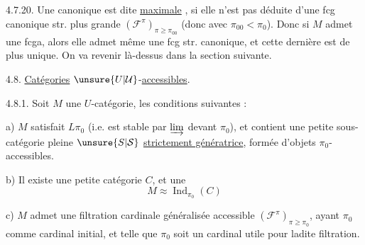 4.7.20. Une  canonique est dite \uline{maximale}
,
si elle n'est pas  déduite d'une fcg canonique
str. plus grande $(\mathcal F^\pi)_{\pi\geq\pi_{00}}$ (donc avec
$\pi_{00}<\pi_0$).  Donc si $M$ admet une
fcga, alors elle admet même une
fcg str. canonique, et cette dernière est de
plus unique.  On va revenir
là-dessus dans la section suivante.

4.8. \uline{Catégories} $\unsure{U|\mathcal U}$-\uline{accessibles}.

  4.8.1. Soit $M$ une $U$-catégorie,
 les conditions suivantes : 

a) $M$ satisfait  $L\pi_0$ (i.e. est stable par  $\varinjlim$
 devant $\pi_0$), et contient une petite
sous-catégorie pleine $\unsure{S|\mathcal S}$ \uline{strictement
génératrice}, formée d'objets $\pi_0$-accessibles.

b) Il existe une petite catégorie $C$,
et une  
\[
M\approx\operatorname{Ind}_{\pi_0}(C)
\]

c) $M$ admet une filtration cardinale
généralisée accessible $(\mathcal F^\pi)_{\pi\geq\pi_0}$, ayant
$\pi_0$ comme cardinal initial, et telle que
$\pi_0$ soit un cardinal utile pour ladite
filtration.

